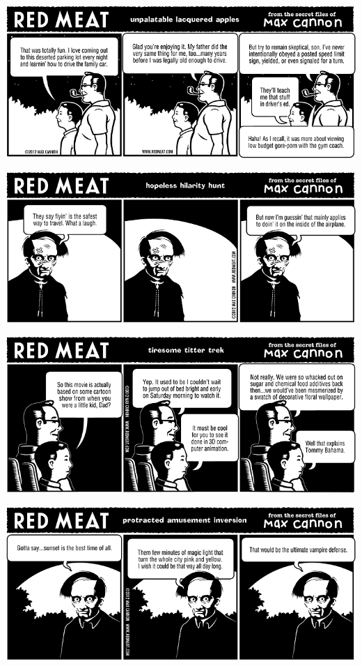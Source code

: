 \documentclass[a4paper,twoside,11pt]{article}
\begin{document}
\includegraphics[width=\textwidth]{redmeat_2012-01-10.png}



\includegraphics[width=\textwidth]{redmeat_2012-01-17.png}



\includegraphics[width=\textwidth]{redmeat_2012-01-24.png}



\includegraphics[width=\textwidth]{redmeat_2012-01-31.png}
\end{document}
